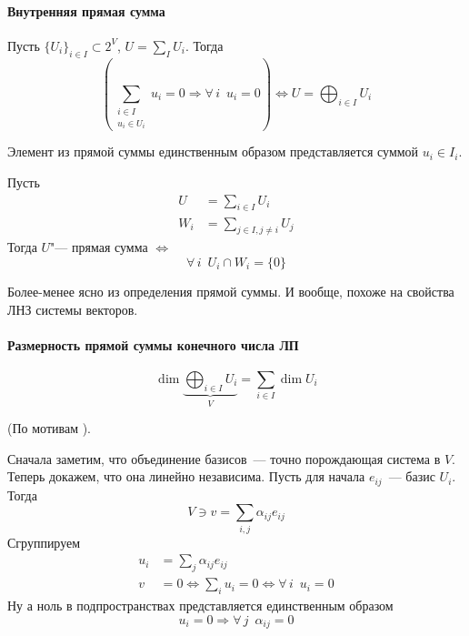 \documentclass[12pt]{../../../notes}
\begin{document}
\paragraph{Внутренняя прямая сумма}
\begin{defn}\label{defn:dirsum}
  Пусть $\{U_i\}_{i\in I} \subset 2^V$, $U = \sum_I U_i$. Тогда
  \[
    \left( \sum_{\substack{i\in I \\ u_i\in U_i}} u_i = 0 
    \Rightarrow \forall\, i \;\: u_i = 0\right)
    \Leftrightarrow U = \bigoplus_{i\in I} U_i
  \]
\end{defn}

\begin{lem}\label{lem:dirsumuniq}
  Элемент из прямой суммы единственным образом представляется суммой $u_i \in I_i$.
\end{lem}

\begin{thrm}\label{thrm:dirsumcrit}
  Пусть  
  \begin{align*}
    U   &= \sum_{i \in I}  U_i \\
    W_i &= \sum_{j\in I, j\neq i} U_j
  \end{align*}
  Тогда $U$"--- прямая сумма $\Leftrightarrow$ 
  \[
    \forall\, i \;\: U_i \cap W_i = \{0\}
  \]
\end{thrm}
\begin{ittproof}
  Более-менее ясно из определения прямой суммы. И вообще, похоже на свойства ЛНЗ системы
  векторов. 
\end{ittproof}

\paragraph{Размерность прямой суммы конечного числа ЛП}
\begin{thrm}\label{thrm:dimdirsum}
  \[
    \dim \underbrace{\bigoplus_{i\in I} U_i}_{V} = \sum_{i\in I} \dim U_i
  \]
\end{thrm}
\begin{ittproof}
(По мотивам \cite[стр.~195]{vinberg}).

  Сначала заметим, что объединение базисов~--- точно порождающая система в $V$.
  Теперь докажем, что она линейно независима.
  Пусть для начала ${e_{ij}}$~--- базис $U_i$.
  Тогда 
  \[
    V \ni v = \sum_{i,j} \alpha_{ij} e_{ij} 
  \]
  Сгруппируем
  \begin{align*}
    u_i &= \sum_j \alpha_{ij} e_{ij} \\
      v &= 0 \Leftrightarrow \sum_i u_i = 0 \Leftrightarrow \forall\, i \;\: u_i = 0
  \end{align*}
  Ну а ноль в подпространствах представляется единственным образом
  \[
    u_i = 0 \Rightarrow \forall\, j \;\: \alpha_{ij} = 0
  \]
\end{ittproof} 
\end{document}

